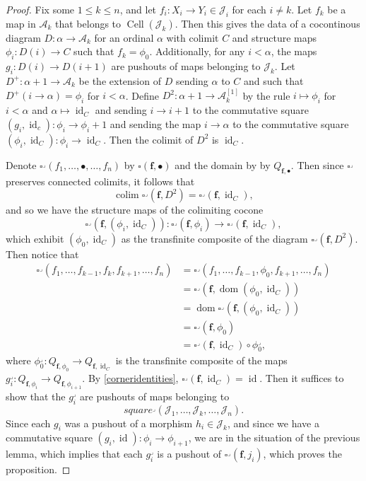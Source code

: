 \documentclass{amsart}
\numberwithin{equation}{section}
\theoremstyle{plain}   %
\theoremstyle{remark}
\theoremstyle{plain}
\DeclareMathOperator{\id}{id}
\DeclareMathOperator{\colim}{colim}
\begin{document}
\begin{proof}
	Fix some \(1\leq k\leq n\), and let \(f_i:X_i\to Y_i \in \mathscr{J}_i\) for each \(i\neq k\). 
	Let \(f_k\) be a map in \(\mathcal{A}_k\) that belongs to \(\operatorname{Cell}(\mathscr{J}_k)\).  Then this gives the data of a cocontinous diagram \(D:\alpha \to \mathcal{A}_k\) for an ordinal \(\alpha\) with colimit \(C\) and structure maps \(\phi_i: D(i)\to C\) such that \(f_k=\phi_0\).  Additionally, for any \(i <\alpha\), the maps \(g_i:D(i)\to D(i+1)\) are pushouts of maps belonging to \(\mathscr{J}_k\). Let \(D^+:\alpha+1\to \mathcal{A}_k\) be the extension of \(D\) sending \(\alpha\) to \(C\) and such that \(D^+(i\to \alpha)=\phi_i\) for \(i<\alpha\).  Define \(D^2: \alpha+1\to \mathcal{A}_k^{[1]}\) by the rule \(i\mapsto \phi_i\) for \(i<\alpha\) and \(\alpha\mapsto \id_C\) and sending \(i\to i+1\) to the commutative square \((g_i,\id_c):\phi_i\to \phi_i+1\) and sending the map \(i\to \alpha\) to the commutative square \((\phi_i,\id_C):\phi_i\to \id_C\).  Then the colimit of \(D^2\) is \(\id_C\).  

	Denote \(\square^\lrcorner(f_1,\dots,\bullet,\dots, f_n)\) by \(\square(\mathbf{f},\bullet)\) and the domain by by \(Q_{\mathbf{f},\bullet}\).  Then since \(\square^\lrcorner\) preserves connected colimits, it follows that 
	\[\colim\square^\lrcorner(\mathbf{f},D^2)=\square^\lrcorner(\mathbf{f},\id_C),\]
	and so we have the structure maps of the colimiting cocone
	\[\square^\lrcorner(\mathbf{f},(\phi_i,\id_C)): \square^\lrcorner(\mathbf{f},\phi_i) \to \square^\lrcorner(\mathbf{f},\id_C),\]
	which exhibit \((\phi_0,\id_C)\) as the transfinite composite of the diagram \(\square^\lrcorner(\mathbf{f},D^2)\).  
	Then notice that
	\begin{align*}
		\square^\lrcorner(f_1,\dots,f_{k-1},f_k,f_{k+1},\dots,f_n)&=\square^\lrcorner(f_1,\dots,f_{k-1},\phi_0,f_{k+1},\dots,f_n)\\
		&=\square^\lrcorner(\mathbf{f},\operatorname{dom}(\phi_0,\id_C))\\
		&=\operatorname{dom}\square^\lrcorner(\mathbf{f},(\phi_0,\id_C))\\
		&=\square^\lrcorner(\mathbf{f},\phi_0)\\
		&=\square^\lrcorner(\mathbf{f},\id_C)\circ \phi_0^\lrcorner,
	\end{align*}
	where \(\phi_0^\lrcorner:Q_{\mathbf{f},\phi_0}\to Q_{\mathbf{f},\id_C}\) is the transfinite composite of the maps \(g_i^\lrcorner: Q_{\mathbf{f},\phi_i} \to Q_{\mathbf{f},\phi_{i+1}}\).  By \ref{corneridentities}, \(\square^\lrcorner(\mathbf{f},\id_C)= \id\).  Then it suffices to show that the \(g_i^\lrcorner\) are pushouts of maps belonging to 
	\[square^\lrcorner(\mathscr{J}_1,\dots, \mathscr{J}_k,\dots ,\mathscr{J}_n).\]
	Since each \(g_i\) was a pushout of a morphism \(h_i \in \mathscr{J}_k\), and since we have a commutative square \((g_i,\id):\phi_i\to \phi_{i+1}\), we are in the situation of the previous lemma, which implies that each \(g_i^\lrcorner\) is a pushout of \(\square^\lrcorner(\mathbf{f},j_i)\), which proves the proposition.
\end{proof}
\end{document}
